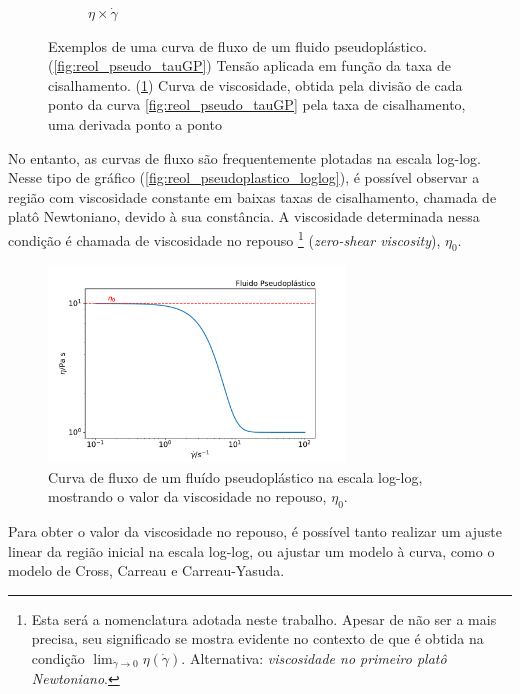 \begin{figure}[h]
\begin{subfigure}[t]{.5\textwidth}
					\caption{\(\eta \times \dot{\gamma}\)}
					\label{fig:reol_pseudo_etaGP}
				\end{subfigure}
				\caption{Exemplos de uma curva de fluxo de um fluido pseudoplástico. (\ref{fig:reol_pseudo_tauGP}) Tensão aplicada em função da taxa de cisalhamento. (\ref{fig:reol_pseudo_etaGP}) Curva de viscosidade, obtida pela divisão de cada ponto da curva \ref{fig:reol_pseudo_tauGP} pela taxa de cisalhamento, uma derivada ponto a ponto}
				\label{fig:reol_pseudoplastico_exemplos}
			\end{figure} 
			
			No entanto, as curvas de fluxo são frequentemente plotadas na escala log-log. Nesse tipo de gráfico (\autoref{fig:reol_pseudoplastico_loglog}), é possível observar a região com viscosidade constante em baixas taxas de cisalhamento, chamada de platô Newtoniano, devido à sua constância. A viscosidade determinada nessa condição é chamada de viscosidade no repouso%
			\footnote{Esta será a nomenclatura adotada neste trabalho. Apesar de não ser a mais precisa, seu significado se mostra evidente no contexto de que é obtida na condição \(\lim_{\dot{\gamma} \to 0} \eta \left( \dot{\gamma} \right) \). Alternativa: \emph{viscosidade no primeiro platô Newtoniano}.} %
		    (\emph{zero-shear viscosity}), \(\eta_0\).\cite{Kronberg2014a}
			
			\begin{figure}[h]
				\centering
				\includegraphics[width=0.7\textwidth]{./imagens/reologia/Pseudoplastico_loglog}
				\caption{Curva de fluxo de um fluído pseudoplástico na escala log-log, mostrando o valor da viscosidade no repouso, \(\eta_0\).}
				\label{fig:reol_pseudoplastico_loglog}
			\end{figure}
		
			Para obter o valor da viscosidade no repouso, é possível tanto realizar um ajuste linear da região inicial na escala log-log, ou ajustar um modelo à curva, como o modelo de Cross, Carreau e Carreau-Yasuda.
			
